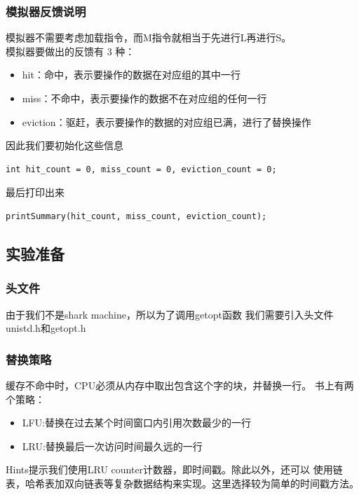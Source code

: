 \documentclass[12pt, a4paper, oneside]{ctexart}
\begin{document}
\subsubsection{模拟器反馈说明}
\noindent
模拟器不需要考虑加载指令，而M指令就相当于先进行L再进行S。\\
模拟器要做出的反馈有 3 种：
\begin{itemize}
    \item hit：命中，表示要操作的数据在对应组的其中一行
    \item miss：不命中，表示要操作的数据不在对应组的任何一行
    \item eviction：驱赶，表示要操作的数据的对应组已满，进行了替换操作
\end{itemize}
因此我们要初始化这些信息
\begin{lstlisting}
int hit_count = 0, miss_count = 0, eviction_count = 0; 
\end{lstlisting}
最后打印出来
\begin{lstlisting}
printSummary(hit_count, miss_count, eviction_count);
\end{lstlisting}
\subsection{实验准备}
\subsubsection{头文件}
\noindent
由于我们不是shark machine，所以为了调用getopt函数
我们需要引入头文件unistd.h和getopt.h
\subsubsection{替换策略}
\noindent
缓存不命中时，CPU必须从内存中取出包含这个字的块，并替换一行。
书上有两个策略：
\begin{itemize}
    \item LFU:替换在过去某个时间窗口内引用次数最少的一行
    \item LRU:替换最后一次访问时间最久远的一行
\end{itemize}
Hints提示我们使用LRU counter计数器，即时间戳。除此以外，还可以
使用链表，哈希表加双向链表等复杂数据结构来实现。这里选择较为简单的时间戳方法。
\end{document}
